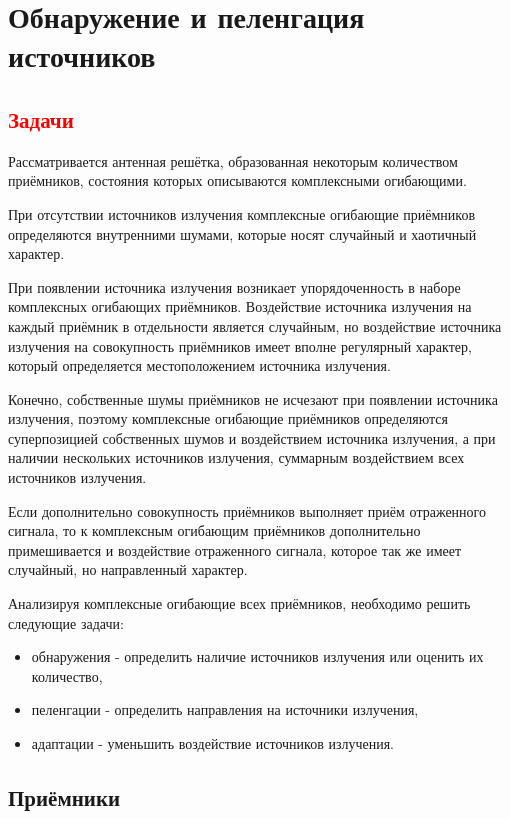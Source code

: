 \chapter{Обнаружение и пеленгация источников}


\section{\textcolor{red}{Задачи}}

Рассматривается антенная решётка, образованная некоторым количеством приёмников, состояния которых описываются комплексными огибающими.

При отсутствии источников излучения комплексные огибающие приёмников определяются внутренними шумами, которые носят случайный и хаотичный характер.

При появлении источника излучения возникает упорядоченность в наборе комплексных огибающих приёмников. Воздействие источника излучения на каждый приёмник
в отдельности является случайным, но воздействие источника излучения на совокупность приёмников имеет вполне регулярный характер, который
определяется местоположением источника излучения.

Конечно, собственные шумы приёмников не исчезают при появлении источника излучения, поэтому комплексные огибающие приёмников определяются
суперпозицией собственных шумов и воздействием источника излучения, а при наличии нескольких источников излучения, суммарным воздействием всех источников излучения.

Если дополнительно совокупность приёмников выполняет приём отраженного сигнала, то к комплексным огибающим приёмников дополнительно примешивается и
воздействие отраженного сигнала, которое так же имеет случайный, но направленный характер.

Анализируя комплексные огибающие всех приёмников, необходимо решить следующие задачи:
\begin{itemize}
    \item обнаружения - определить наличие источников излучения или оценить их количество,
    \item пеленгации - определить направления на источники излучения,
    \item адаптации - уменьшить воздействие источников излучения.
\end{itemize}


\section{Приёмники}

